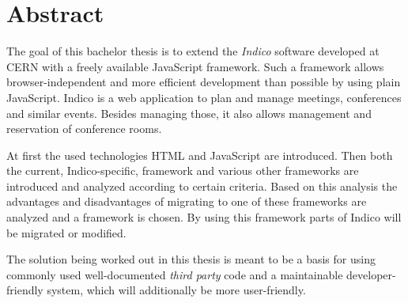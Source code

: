 \chapter*{Abstract}
\thispagestyle{empty}

The goal of this bachelor thesis is to extend the \emph{Indico} software developed at CERN with a
freely available JavaScript framework. Such a framework allows browser-independent and more
efficient development than possible by using plain JavaScript. Indico is a web application to plan
and manage meetings, conferences and similar events. Besides managing those, it also allows
management and reservation of conference rooms.

At first the used technologies HTML and JavaScript are introduced. Then both the current,
Indico-specific, framework and various other frameworks are introduced and analyzed according to
certain criteria. Based on this analysis the advantages and disadvantages of migrating to one of
these frameworks are analyzed and a framework is chosen. By using this framework parts of Indico
will be migrated or modified.

The solution being worked out in this thesis is meant to be a basis for using commonly used
well-documented \emph{third party} code and a maintainable developer-friendly system, which will
additionally be more user-friendly.

